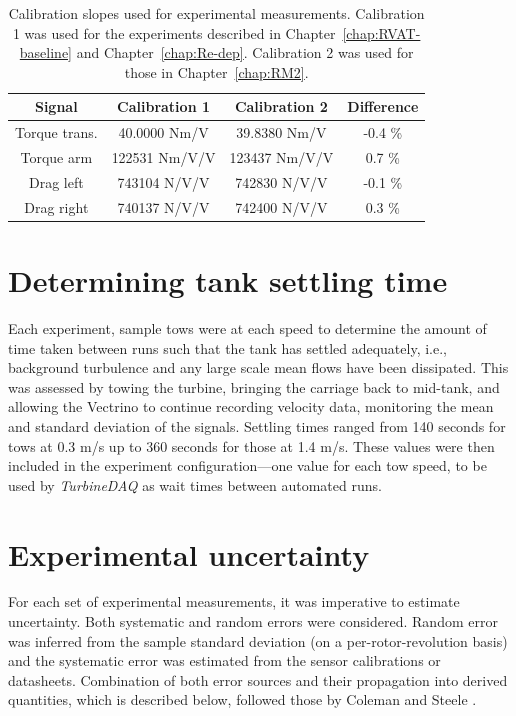 \begin{table}
    \centering
\begin{tabular}{c|c|c|c}
    Signal & Calibration 1 & Calibration 2 & Difference \\ 
    \hline 
    Torque trans. & 40.0000 Nm/V & 39.8380 Nm/V & -0.4 \% \\ 
    Torque arm & 122531 Nm/V/V & 123437 Nm/V/V & 0.7 \% \\ 
    Drag left & 743104 N/V/V & 742830 N/V/V & -0.1 \% \\ 
    Drag right & 740137 N/V/V & 742400 N/V/V & 0.3 \% \\ 
\end{tabular}
    \caption{Calibration slopes used for experimental measurements. Calibration
        1 was used for the experiments described in Chapter~\ref{chap:RVAT-baseline}
        and Chapter~\ref{chap:Re-dep}. Calibration 2 was used for those in
        Chapter~\ref{chap:RM2}.}
    
    \label{tab:calibrations}
\end{table}


\section{Determining tank settling time}

Each experiment, sample tows were at each speed to determine the amount of time
taken between runs such that the tank has settled adequately, i.e., background
turbulence and any large scale mean flows have been dissipated. This was
assessed by towing the turbine, bringing the carriage back to mid-tank, and
allowing the Vectrino to continue recording velocity data, monitoring the mean
and standard deviation of the signals. Settling times ranged from 140 seconds
for tows at 0.3 m/s up to 360 seconds for those at 1.4 m/s. These values were
then included in the experiment configuration---one value for each tow speed, to
be used by \textit{TurbineDAQ} as wait times between automated runs.


\section{Experimental uncertainty}


For each set of experimental measurements, it was imperative to estimate
uncertainty. Both systematic and random errors were considered. Random error was
inferred from the sample standard deviation (on a per-rotor-revolution basis)
and the systematic error was estimated from the sensor calibrations or
datasheets. Combination of both error sources and their propagation into derived
quantities, which is described below, followed those by Coleman and Steele
\cite{ColemanSteele}.

